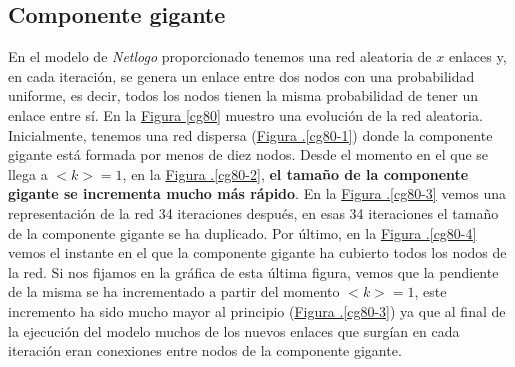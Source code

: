 \documentclass[10pt,a4paper,spanish]{article}
\numberwithin{equation}{section} %
\numberwithin{figure}{section} %
\numberwithin{table}{section} %
\theoremstyle{plain}
\theoremstyle{definition}
\begin{document}
\subsection{Componente gigante}
En el modelo de \textit{Netlogo} proporcionado tenemos una red aleatoria de $x$ enlaces y, en cada iteración, se genera un enlace entre dos nodos con una probabilidad uniforme, es decir, todos los nodos tienen la misma probabilidad de tener un enlace entre sí. En la \hyperref[cg80]{Figura \ref*{cg80}} muestro una evolución de la red aleatoria. Inicialmente, tenemos una red dispersa (\hyperref[cg80-1]{Figura \thesection .\ref*{cg80-1}}) donde la componente gigante está formada por menos de diez nodos. Desde el momento en el que se llega a $<k>=1$, en la \hyperref[cg80-2]{Figura \thesection .\ref*{cg80-2}}, \textbf{el tamaño de la componente gigante se incrementa mucho más rápido}. En la \hyperref[cg80-3]{Figura \thesection .\ref*{cg80-3}} vemos una representación de la red 34 iteraciones después, en esas 34 iteraciones el tamaño de la componente gigante se ha duplicado. Por último, en la \hyperref[cg80-4]{Figura \thesection .\ref*{cg80-4}} vemos el instante en el que la componente gigante ha cubierto todos los nodos de la red. Si nos fijamos en la gráfica de esta última figura, vemos que la pendiente de la misma se ha incrementado a partir del momento $<k>=1$, este incremento ha sido mucho mayor al principio (\hyperref[cg80-3]{Figura \thesection .\ref*{cg80-3}}) ya que al final de la ejecución del modelo muchos de los nuevos enlaces que surgían en cada iteración eran conexiones entre nodos de la componente gigante.
\end{document}
